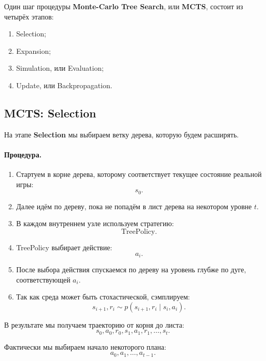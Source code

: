 \documentclass[12pt,a4paper]{article}
\begin{document}
Один шаг процедуры \textbf{Monte-Carlo Tree Search}, или \textbf{MCTS}, состоит из четырёх этапов:

\begin{enumerate}
    \item Selection;
    \item Expansion;
    \item Simulation, или Evaluation;
    \item Update, или Backpropagation.
\end{enumerate}

\subsection{MCTS: Selection}

На этапе \textbf{Selection} мы выбираем ветку дерева, которую будем расширять.

\paragraph{Процедура.}

\begin{enumerate}
    \item Стартуем в корне дерева, которому соответствует текущее состояние реальной игры:
    \[
    s_0.
    \]

    \item Далее идём по дереву, пока не попадём в лист дерева на некотором уровне $t$.

    \item В каждом внутреннем узле используем стратегию:
    \[
    \text{TreePolicy}.
    \]

    \item TreePolicy выбирает действие:
    \[
    a_i.
    \]

    \item После выбора действия спускаемся по дереву на уровень глубже по дуге, соответствующей $a_i$.

    \item Так как среда может быть стохастической, сэмплируем:
    \[
    s_{i+1},r_i
    \sim
    p(s_{i+1},r_i\mid s_i,a_i).
    \]
\end{enumerate}

В результате мы получаем траекторию от корня до листа:
\[
s_0,a_0,r_0,s_1,a_1,r_1,\ldots,s_t.
\]

Фактически мы выбираем начало некоторого плана:
\[
a_0,a_1,\ldots,a_{t-1}.
\]
\end{document}
